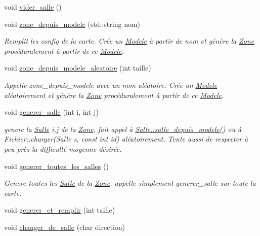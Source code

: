 \begin{DoxyCompactItemize}
void \hyperlink{classZone_a0f61f5c9028db56ef251371818b31b35}{vider\+\_\+salle} ()
\item 
void \hyperlink{classZone_a411c8abc6ba0b85239bea9aa2daac45c}{zone\+\_\+depuis\+\_\+modele} (std\+::string nom)
\begin{DoxyCompactList}\small\item\em Remplit les {\itshape config} de la {\itshape carte}. Crée un \hyperlink{classModele}{Modele} à partir de {\itshape nom} et génère la \hyperlink{classZone}{Zone} procéduralement à partir de ce \hyperlink{classModele}{Modele}. \end{DoxyCompactList}\item 
void \hyperlink{classZone_a64b87f18b343a38b40a2fbf9220b3994}{zone\+\_\+depuis\+\_\+modele\+\_\+aleatoire} (int taille)
\begin{DoxyCompactList}\small\item\em Appelle zone\+\_\+depuis\+\_\+modele avec un nom aléatoire. Crée un \hyperlink{classModele}{Modele} aléatoirement et génère la \hyperlink{classZone}{Zone} procéduralement à partir de ce \hyperlink{classModele}{Modele}. \end{DoxyCompactList}\item 
void \hyperlink{classZone_a2a149ff3989dbe48c1dd1822f158da8e}{generer\+\_\+salle} (int i, int j)
\begin{DoxyCompactList}\small\item\em genere la \hyperlink{classSalle}{Salle} i,j de la \hyperlink{classZone}{Zone}. fait appel à \hyperlink{classSalle_a6eaf8452709243464f7919b53bccc0b3}{Salle\+::salle\+\_\+depuis\+\_\+modele()} ou à Fichier\+::charger(\+Salle s, const int id) aléatoirement. Tente aussi de respecter à peu près la difficulté moyenne désirée. \end{DoxyCompactList}\item 
void \hyperlink{classZone_a91c45becbd6371aecf0b26ee68bb06f5}{generer\+\_\+toutes\+\_\+les\+\_\+salles} ()
\begin{DoxyCompactList}\small\item\em Genere toutes les \hyperlink{classSalle}{Salle} de la \hyperlink{classZone}{Zone}. appelle simplement generer\+\_\+salle sur toute la carte. \end{DoxyCompactList}\item 
void \hyperlink{classZone_a55883c546c6359642a9b50ad4ba48c78}{generer\+\_\+et\+\_\+remplir} (int taille)
\item 
void \hyperlink{classZone_a5563c71779d4c897df21da0f5a01df8d}{changer\+\_\+de\+\_\+salle} (char direction)
\end{DoxyCompactItemize}


